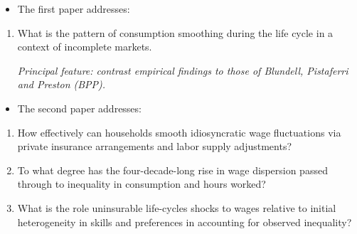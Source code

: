 \documentclass[notes=show]{beamer}
\begin{document}
\begin{frame}%



\begin{itemize}
\item The first paper addresses:
\end{itemize}

\begin{enumerate}
\item What is the pattern of consumption smoothing during the life cycle in
a context of incomplete markets.

\textit{Principal feature: contrast empirical findings to those of Blundell,
Pistaferri and Preston (BPP).}
\end{enumerate}

\begin{itemize}
\item The second paper addresses:
\end{itemize}

\begin{enumerate}
\item How effectively can households smooth idiosyncratic wage fluctuations
via private insurance arrangements and labor supply adjustments?

\item To what degree has the four-decade-long rise in wage dispersion passed
through to inequality in consumption and hours worked?

\item What is the role uninsurable life-cycles shocks to wages relative to
initial heterogeneity in skills and preferences in accounting for observed
inequality?
\end{enumerate}

\transboxout%
\end{frame}%

\bigskip
\end{document}
